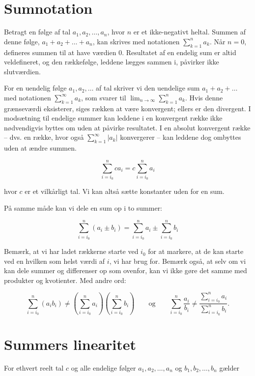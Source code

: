 \section*{Sumnotation}

Betragt en følge af tal \( a_1, a_2, \ldots, a_n \), hvor \( n \) er et ikke-negativt heltal. Summen af denne følge, \( a_1 + a_2 + \dots + a_n \), kan skrives med notationen \( \sum_{k=1}^n a_k \). Når \( n = 0 \), defineres summen til at have værdien 0. Resultatet af en endelig sum er altid veldefineret, og den rækkefølge, leddene lægges sammen i, påvirker ikke slutværdien.

For en uendelig følge \( a_1, a_2, \ldots \) af tal skriver vi den uendelige sum \( a_1 + a_2 + \dots \) med notationen \( \sum_{k=1}^{\infty} a_k \), som svarer til \( \lim_{n \rightarrow \infty} \sum_{k=1}^n a_k \). Hvis denne grænseværdi eksisterer, siges rækken at være konvergent; ellers er den divergent. I modsætning til endelige summer kan leddene i en konvergent række ikke nødvendigvis byttes om uden at påvirke resultatet. I en absolut konvergent række -- dvs. en række, hvor også \( \sum_{k=1}^{\infty} |a_k| \) konvergerer -- kan leddene dog ombyttes uden at ændre summen.

\[
    \sum_{i=i_0}^n c a_i=c \sum_{i=i_0}^n a_i
\]

hvor $c$ er et vilkårligt tal. Vi kan altså sætte konstanter uden for en sum.

På samme måde kan vi dele en sum op i to summer:

\[
\sum_{i=i_0}^n\left(a_i \pm b_i\right)=\sum_{i=i_0}^n a_i \pm \sum_{i=i_0}^n b_i
\]

Bemærk, at vi har ladet rækkerne starte ved $i_0$ for at markere, at de kan starte ved en hvilken som helst værdi af $i$, vi har brug for. Bemærk også, at selv om vi kan dele summer og differenser op som ovenfor, kan vi ikke gøre det samme med produkter og kvotienter. Med andre ord:

\[
    \sum_{i=i_0}^n\left(a_i b_i\right) \neq\left(\sum_{i=i_0}^n a_i\right)\left(\sum_{i=i_0}^n b_i\right) \qquad \text{og} \qquad \sum_{i=i_0}^n \frac{a_i}{b_i} \neq \frac{\sum_{i=i_0}^n a_i}{\sum_{i=i_0}^n b_i}.
\]

\section*{Summers linearitet}
For ethvert reelt tal $c$ og alle endelige følger $a_1, a_2, \ldots, a_n$ og $b_1, b_2, \ldots, b_n$ gælder

